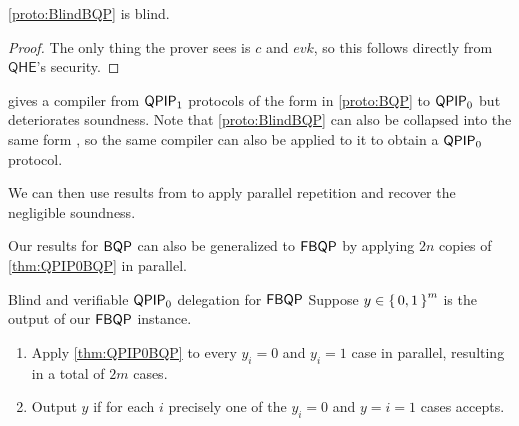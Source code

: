\begin{thm}
	\cref{proto:BlindBQP} is blind.
\end{thm}
\begin{proof}
	The only thing the prover sees is $c$ and $evk$, so this follows directly from $\mathsf{QHE}$'s security.
\end{proof}


\cite{mahadev_delegation} gives a compiler from $\operatorname{\mathsf{QPIP}}_1$ protocols of the form in \cref{proto:BQP} to $\operatorname{\mathsf{QPIP}}_0$ but deteriorates soundness.
Note that \cref{proto:BlindBQP} can also be collapsed into the same form , so the same compiler can also be applied to it to obtain a $\operatorname{\mathsf{QPIP}}_0$ protocol.

We can then use results from \cite{parallelrep} to apply parallel repetition and recover the negligible soundness.


Our results for $\operatorname{\mathsf{BQP}}$ can also be generalized to $\operatorname{\mathsf{FBQP}}$ by applying $2n$ copies of \cref{thm:QPIP0BQP} in parallel.

\begin{protocol}{Blind and verifiable $\operatorname{\mathsf{QPIP}}_0$ delegation for $\operatorname{\mathsf{FBQP}}$}
	\label{QPIP0FBQP}
	Suppose $y\in\set{0,1}^m$ is the output of our $\operatorname{\mathsf{FBQP}}$ instance.
	\begin{enumerate}
		\item Apply \cref{thm:QPIP0BQP} to every $y_i=0$ and $y_i=1$ case in parallel, resulting in a total of $2m$ cases.
		\item Output $y$ if for each $i$ precisely one of the $y_i=0$ and $y=i=1$ cases accepts.
	\end{enumerate}
\end{protocol}

